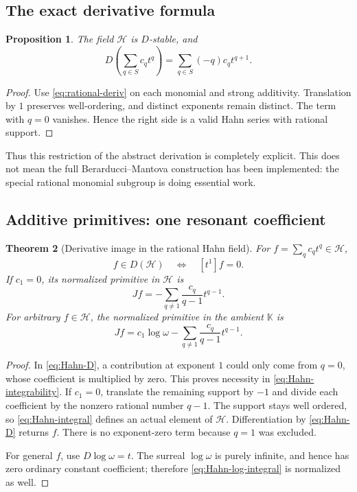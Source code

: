 \documentclass[11pt,a4paper]{article}
\numberwithin{equation}{section}
\newtheorem{theorem}{Theorem}[section]
\newtheorem{proposition}[theorem]{Proposition}
\theoremstyle{definition}
\theoremstyle{remark}
\newcommand{\K}{\mathbb K}
\newcommand{\HH}{\mathscr H}
\begin{document}
\subsection{The exact derivative formula}

\begin{proposition}\label{prop:Hahn-deriv}
The field $\HH$ is $D$-stable, and
\begin{equation}\label{eq:Hahn-D}
 D\left(\sum_{q\in S}c_qt^q\right)
 =\sum_{q\in S}(-q)c_qt^{q+1}.
\end{equation}
\end{proposition}
\begin{proof}
Use \eqref{eq:rational-deriv} on each monomial and strong additivity.
Translation by $1$ preserves well-ordering, and distinct exponents remain
distinct. The term with $q=0$ vanishes. Hence the right side is a valid
Hahn series with rational support.
\end{proof}

Thus this restriction of the abstract derivation is completely explicit.
This does not mean the full Berarducci--Mantova construction has been
implemented: the special rational monomial subgroup is doing essential
work.

\subsection{Additive primitives: one resonant coefficient}

\begin{theorem}[Derivative image in the rational Hahn field]
\label{thm:Hahn-integral}
For $f=\sum_q c_qt^q\in\HH$,
\begin{equation}\label{eq:Hahn-integrability}
 f\in D(\HH)\quad\Longleftrightarrow\quad [t^1]f=0.
\end{equation}
If $c_1=0$, its normalized primitive in $\HH$ is
\begin{equation}\label{eq:Hahn-integral}
 Jf=-\sum_{q\ne1}\frac{c_q}{q-1}t^{q-1}.
\end{equation}
For arbitrary $f\in\HH$, the normalized primitive in the ambient $\K$ is
\begin{equation}\label{eq:Hahn-log-integral}
 Jf=c_1\log\omega-
       \sum_{q\ne1}\frac{c_q}{q-1}t^{q-1}.
\end{equation}
\end{theorem}
\begin{proof}
In \eqref{eq:Hahn-D}, a contribution at exponent $1$ could only come from
$q=0$, whose coefficient is multiplied by zero. This proves necessity in
\eqref{eq:Hahn-integrability}. If $c_1=0$, translate the remaining support
by $-1$ and divide each coefficient by the nonzero rational number $q-1$.
The support stays well ordered, so \eqref{eq:Hahn-integral} defines an
actual element of $\HH$. Differentiation by \eqref{eq:Hahn-D} returns $f$.
There is no exponent-zero term because $q=1$ was excluded.

For general $f$, use $D\log\omega=t$. The surreal $\log\omega$ is purely
infinite, and hence has zero ordinary constant coefficient; therefore
\eqref{eq:Hahn-log-integral} is normalized as well.
\end{proof}
\end{document}
